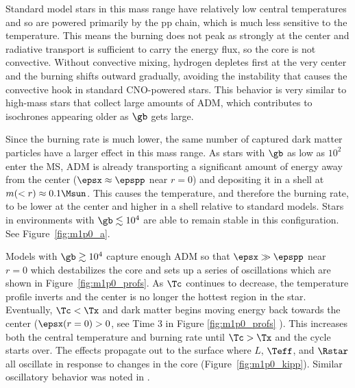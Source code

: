   Standard model stars in this mass range have relatively low central temperatures and so are powered primarily by the pp chain, which is much less sensitive to the temperature. This means the burning does not peak as strongly at the center and radiative transport is sufficient to carry the energy flux, so the core is not convective. Without convective mixing, hydrogen depletes first at the very center and the burning shifts outward gradually, avoiding the instability that causes the convective hook in standard CNO-powered stars. This behavior is very similar to high-mass stars that collect large amounts of ADM, which contributes to isochrones appearing older as $\gb$ gets large.

  Since the burning rate is much lower, the same number of captured dark matter particles have a larger effect in this mass range. As stars with $\gb$ as low as $10^2$  enter the MS, ADM is already transporting a significant amount of energy away from the center ($\epsx \approx \epspp$ near $r=0$) and depositing it in a shell at $m(<r) \approx 0.1 \Msun$. This causes the temperature, and therefore the burning rate, to be lower at the center and higher in a shell relative to standard models. Stars in environments with $\gb \lesssim 10^4$ are able to remain stable in this configuration. See Figure~\ref{fig:m1p0_a}.

  Models with $\gb \gtrsim 10^4$ capture enough ADM so that $\epsx \gg \epspp$ near $r=0$ which destabilizes the core and sets up a series of oscillations which are shown in Figure~\ref{fig:m1p0_profs}. 
 As $\Tc$ continues to decrease, the temperature profile inverts and the center is no longer the hottest region in the star. Eventually, $\Tc < \Tx$ and dark matter begins moving energy back towards the center ($\epsx(r=0) > 0$, see Time 3 in Figure \ref{fig:m1p0_profs} ). This increases both the central temperature and burning rate until $\Tc > \Tx$ and the cycle starts over. The effects propagate out to the surface where
  $L$, $\Teff$, and $\Rstar$ all oscillate in response to changes in the core (Figure~\ref{fig:m1p0_kipp}). Similar oscillatory behavior was noted in \citet{Iocco2012} .

